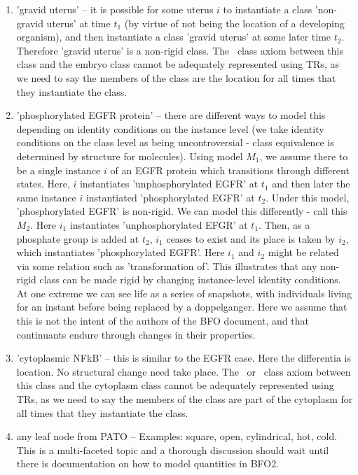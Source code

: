\documentclass{bioinfo}
\begin{document}
\begin{enumerate}
  \item 'gravid uterus' -- it is possible for some uterus $i$ to
    instantiate a class 'non-gravid uterus' at time $t_1$ (by virtue
    of not being the location of a developing organism), and then
    instantiate a class 'gravid uterus' at some later time
    $t_2$. Therefore 'gravid uterus' is a non-rigid class. The
    \ class axiom between this class and the embryo
    class cannot be adequately represented using TRs, as we need to
    say the members of the class are the location for all times that
    they instantiate the class.


  \item 'phosphorylated EGFR protein' -- there are different ways to
    model this depending on identity conditions on the instance level
    (we take identity conditions on the class level as being
    uncontroversial - class equivalence is determined by structure for
    molecules). Using model $M_1$, we assume there to be a single
    instance $i$ of an EGFR protein which transitions through
    different states. Here, $i$ instantiates 'unphosphorylated EGFR'
    at $t_1$ and then later the same instance $i$ instantiated
    'phosphorylated EGFR' at $t_2$. Under this model, 'phosphorylated
    EGFR' is non-rigid. We can model this differently - call this
    $M_2$. Here $i_1$ instantiates 'unphosphorylated EFGR' at
    $t_1$. Then, as a phosphate group is added at $t_2$, $i_1$ ceases
    to exist and its place is taken by $i_2$, which instantiates
    'phosphorylated EGFR'. Here $i_1$ and $i_2$ might be related via
    some relation such as 'transformation of'. This illustrates that
    any non-rigid class can be made rigid by changing instance-level
    identity conditions. At one extreme we can see life as a series of
    snapshots, with individuals living for an instant before being
    replaced by a doppelganger. Here we assume that this is not the
    intent of the authors of the BFO document, and that continuants
    endure through changes in their properties.

  \item 'cytoplasmic NFkB' -- this is similar to the EGFR case. Here
    the differentia is location. No structural change need take
    place. The \ or \ class axiom between
    this class and the cytoplasm class cannot be adequately
    represented using TRs, as we need to say the members of the class
    are part of the cytoplasm for all times that they instantiate the
    class.

  \item any leaf node from PATO -- Examples: square, open,
    cylindrical, hot, cold. This is a multi-faceted topic and a
    thorough discussion should wait until there is documentation on
    how to model quantities in BFO2.

\end{enumerate}
\end{document}
